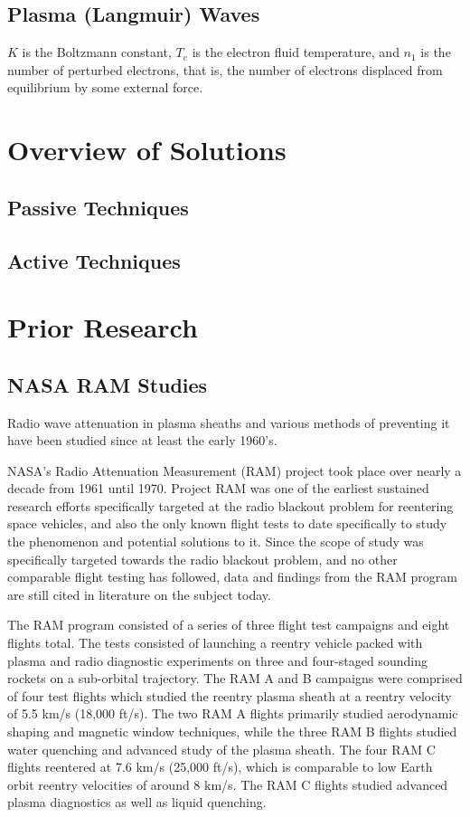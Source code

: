 \documentclass[twocolumn]{article}
\begin{document}
\subsection*{Plasma (Langmuir) Waves}
$K$ is the Boltzmann constant, $T_e$ is the electron fluid temperature, and $n_1$ is the number of perturbed electrons, that is, the number of electrons displaced from equilibrium by some external force.



\section{Overview of Solutions} \label{sec:Overview}
\subsection*{Passive Techniques}
\subsection*{Active Techniques}

\section{Prior Research} \label{sec:Prior}
	\subsection*{NASA RAM Studies}
	Radio wave attenuation in plasma sheaths and various methods of preventing it have been studied since at least the early 1960's.
	
	NASA's Radio Attenuation Measurement (RAM) project took place over nearly a decade from 1961 until 1970.
	Project RAM was one of the earliest sustained research efforts specifically targeted at the radio blackout problem for reentering space vehicles, and also the only known flight tests to date specifically to study the phenomenon and potential solutions to it.
	Since the scope of study was specifically targeted towards the radio blackout problem, and no other comparable flight testing has followed, data and findings from the RAM program are still cited in literature on the subject today.
	
	The RAM program consisted of a series of three flight test campaigns and eight flights total.
	The tests consisted of launching a reentry vehicle packed with plasma and radio diagnostic experiments on three and four-staged sounding rockets on a sub-orbital trajectory.
	The RAM A and B campaigns were comprised of four test flights which studied the reentry plasma sheath at a reentry velocity of 5.5 km/s (18,000 ft/s).\cite{huber_entry_1971}
	The two RAM A flights primarily studied aerodynamic shaping and magnetic window techniques, while the three RAM B flights studied water quenching and advanced study of the plasma sheath.
	The four RAM C flights reentered at 7.6 km/s (25,000 ft/s), which is comparable to low Earth orbit reentry velocities of around 8 km/s. 
	The RAM C flights studied advanced plasma diagnostics as well as liquid quenching.\cite{huber_entry_1971}
\end{document}
